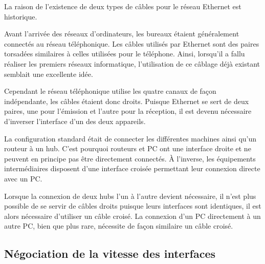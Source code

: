 \documentclass[11pt,a4paper]{article}
\begin{document}
La raison de l'existence de deux types de câbles pour le réseau Ethernet est historique.

Avant l'arrivée des réseaux d'ordinateurs, les bureaux étaient généralement connectés au réseau téléphonique. Les câbles utilisés par Ethernet sont des paires torsadées similaires à celles utilisées pour le téléphone. Ainsi, lorsqu'il a fallu réaliser les premiers réseaux informatique, l'utilisation de ce câblage déjà existant semblait une excellente idée.

Cependant le réseau téléphonique utilise les quatre canaux de façon indépendante, les câbles étaient donc droits. Puisque Ethernet se sert de deux paires, une pour l'émission et l'autre pour la réception, il est devenu nécessaire d'inverser l'interface d'un des deux appareils.

La configuration standard était de connecter les différentes machines ainsi qu'un routeur à un hub. C'est pourquoi routeurs et PC ont une interface droite et ne peuvent en principe pas être directement connectés. À l'inverse, les équipements intermédiaires disposent d'une interface croisée permettant leur connexion directe avec un PC.

Lorsque la connexion de deux hubs l'un à l'autre devient nécessaire, il n'est plus possible de se servir de câbles droits puisque leurs interfaces sont identiques, il est alors nécessaire d'utiliser un câble croisé. La connexion d'un PC directement à un autre PC, bien que plus rare, nécessite de façon similaire un câble croisé.

\subsection{Négociation de la vitesse des interfaces}
\end{document}
